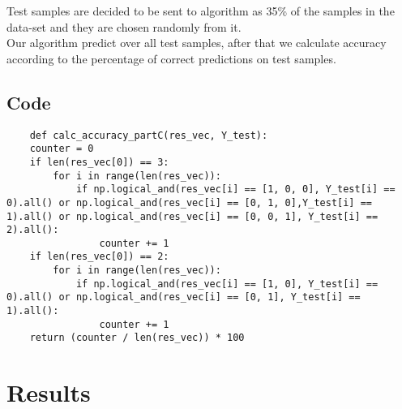 \documentclass[11pt]{article}
\begin{document}
Test samples are decided to be sent to algorithm as 35\% of the samples in the data-set and they are chosen randomly from it.\\
Our algorithm predict over all test samples, after that we calculate accuracy according to the percentage of correct predictions on test samples.\\

\subsection{Code}
\begin{lstlisting}
    def calc_accuracy_partC(res_vec, Y_test):
    counter = 0
    if len(res_vec[0]) == 3:
        for i in range(len(res_vec)):
            if np.logical_and(res_vec[i] == [1, 0, 0], Y_test[i] == 0).all() or np.logical_and(res_vec[i] == [0, 1, 0],Y_test[i] == 1).all() or np.logical_and(res_vec[i] == [0, 0, 1], Y_test[i] == 2).all():
                counter += 1
    if len(res_vec[0]) == 2:
        for i in range(len(res_vec)):
            if np.logical_and(res_vec[i] == [1, 0], Y_test[i] == 0).all() or np.logical_and(res_vec[i] == [0, 1], Y_test[i] == 1).all():
                counter += 1
    return (counter / len(res_vec)) * 100
\end{lstlisting}


\section{Results}
\end{document}
